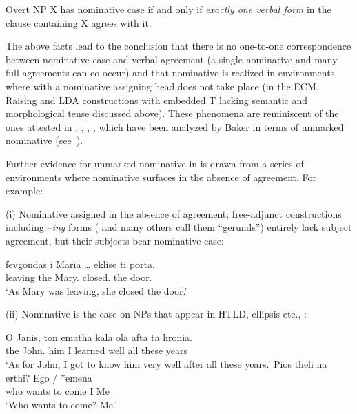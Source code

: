 \documentclass[output=paper]{langsci/langscibook}
\begin{document}
\begin{exe}
    \exi{\eqref{ex:key:13.1}}
    Overt NP X has nominative case if and only if \emph{exactly one verbal
    form} in the clause containing X agrees with it.
\z

The above facts lead to the conclusion that there is no one-to-one
correspondence between nominative case and verbal agreement (a single
nominative and many full agreements can co-occur) and that nominative is
realized in environments where  with a nominative assigning head does not
take place (in the ECM, Raising and \gls{LDA} constructions with embedded T lacking
semantic and morphological tense discussed above). These phenomena are
reminiscent of the ones attested in , ,
, , which have
been analyzed by Baker in terms of unmarked nominative
(see~).

Further evidence for unmarked nominative in  is drawn from a series of
environments where nominative surfaces in the absence of agreement. For
example:

(i) Nominative assigned in the absence of agreement;  free-adjunct
constructions including –\emph{ing} forms (\citealt{Tsimpli2000} and many
others call them \enquote{gerunds}) entirely lack subject agreement, but their
subjects bear nominative case:

\ea%
    \label{ex:key:13.30}
    \sn
    \gll  fevgondas i Maria \dots{}     eklise ti porta.\\
            leaving the Mary.\Nom{} {}  closed.\Tsg{} the door.\Acc{}\\
    \glt  ‘As Mary was leaving, she closed the door.’
\z

(ii) Nominative is the case on NPs that appear in HTLD, ellipsis etc.,
\citet{Schutze2001}:

\ea%
    \label{ex:key:13.31}
	\ea
	\gll  O Janis, ton ematha kala ola afta ta hronia.\\
	    the John.\Nom{} him I learned well all these years\\
	\glt     ‘As for John, I got to know him very well after all these years.’
    \ex
	\gll  Pios theli na erthi?  Ego / *emena\\
            who wants to come  I {} \hphantom{*}Me\\
	\glt     ‘Who wants to come? Me.’
    \z
\z


\end{exe}
\end{document}
